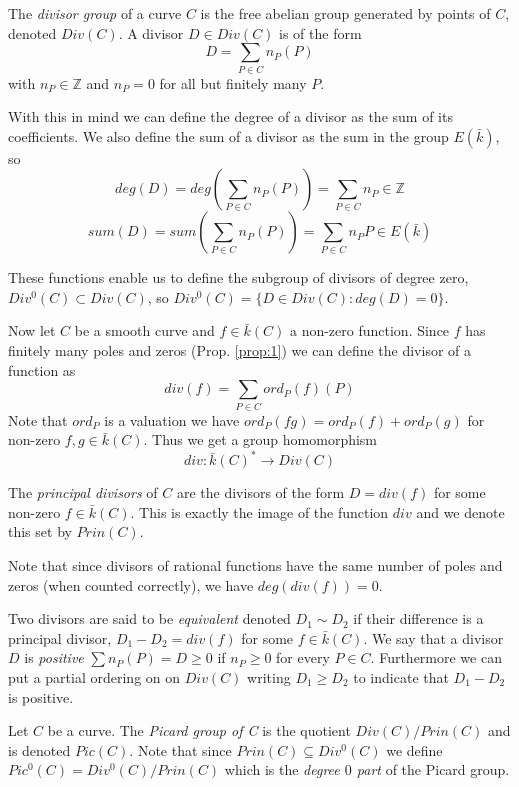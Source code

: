 \begin{mydef}
 The \emph{divisor group} of a curve $C$ is the free abelian group generated by
points of $C$, denoted $Div(C)$. A divisor $D\in Div(C)$ is of the form
$$ D = \sum_{P\in C} n_P(P)$$
with $n_P\in\mathbb{Z}$ and $n_P = 0$ for all but finitely many $P$.
\end{mydef}

With this in mind we can define the degree of a divisor as the sum of its 
coefficients. We also define the sum of a divisor as the sum in the group $E(\bar{k})$, so
$$ deg(D) = deg\left(\sum_{P\in C} n_P(P)\right) = \sum_{P\in C} n_P \in \mathbb{Z}$$
$$ sum(D) = sum\left(\sum_{P\in C} n_P(P)\right) = \sum_{P\in C} n_P P \in E(\bar{k})$$

These functions enable us to define the subgroup of divisors of degree zero,
$Div^0(C) \subset Div(C)$, so $Div^0(C) = \{ D\in Div(C) : deg(D) = 0 \}$.

Now let $C$ be a smooth curve and $f\in \bar{k}(C)$ a non-zero function. Since $f$
has finitely many poles and zeros (Prop. \ref{prop:1}) we can define the divisor of a
function as
$$ div(f) = \sum_{P\in C} ord_P(f)(P) $$
Note that $ord_P$ is a valuation we have $ord_P(fg) = ord_P(f)+ord_P(g)$
for non-zero $f,g\in \bar{k}(C)$. Thus we get a group homomorphism
$$ div: \bar{k}(C)^* \rightarrow Div(C)$$

\begin{mydef}
 The \emph{principal divisors} of $C$ are the divisors of the form
$ D = div(f) $ for some non-zero $f\in \bar{k}(C)$. This is exactly
the image of the function $div$ and we denote this set by $Prin(C)$.
\end{mydef}

Note that since divisors of rational functions have the same number of poles
and zeros (when counted correctly), we have $deg(div(f)) = 0$.

Two divisors are said to be \emph{equivalent} denoted $D_1 \sim D_2$ if
their difference is a principal divisor, $D_1 - D_2 = div(f)$ for some $f\in \bar{k}(C)$.
We say that a divisor $D$ is
\emph{positive} $\sum n_P(P)=D \geq 0$ if $n_P \geq 0$ for every $P\in C$. Furthermore
we can put a partial ordering on on $Div(C)$ writing $D_1 \geq D_2$ to indicate that $D_1 - D_2$ is positive.

\begin{mydef}
 Let $C$ be a curve. The \emph{Picard group of C} is the quotient $Div(C)/Prin(C)$ and is denoted $Pic(C)$.
Note that since $Prin(C) \subseteq Div^0(C)$ we define $Pic^0(C) = Div^0(C)/Prin(C)$ which is the
\emph{degree $0$ part} of the Picard group.
\end{mydef}


